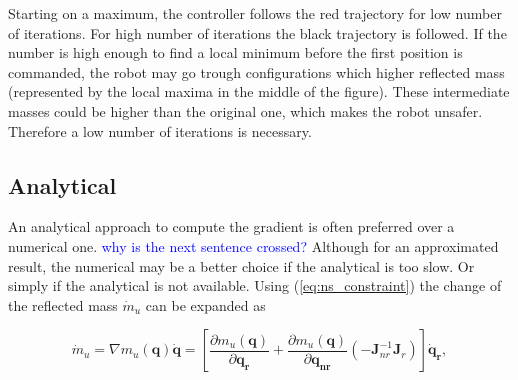 

Starting on a maximum, the controller  follows the red trajectory for low number of iterations. For high number of iterations the black trajectory is followed. If the number is high enough to find a local minimum before the first position is commanded, the robot may go trough configurations which higher reflected mass (represented by the local maxima in the middle of the figure). These intermediate masses could be higher than the original one, which makes the robot unsafer. Therefore a low number of iterations is necessary.





















\label{subsec:2Dminim}




\subsection{Analytical}
\label{sec:analytical}

An analytical approach to compute the gradient is often preferred over a numerical one. \textcolor{blue}{why is the next sentence crossed?} Although for an approximated result, the numerical may be a better choice if the analytical is too slow. Or simply if the analytical is not available.
Using (\ref{eq:ns_constraint}) the change of the reflected mass ${\dot{m}_u}$ can be expanded as

\begin{equation}
{\dot{m}_u}=\nabla m_u(\mathbf{q}) \dot{\mathbf{q}} = \left[ \frac{\partial {m_u(\mathbf{q})}}{\partial{\mathbf{q_{r}}}} + \frac{\partial {m_u(\mathbf{q})}}{\partial{\mathbf{q_{nr}}}}  (- \mathbf{J}_{nr}^{-1} \mathbf{J}_r) \right ]  \mathbf{\dot{q}_r} ,
\label{eq:mass_expanded}
\end{equation}


